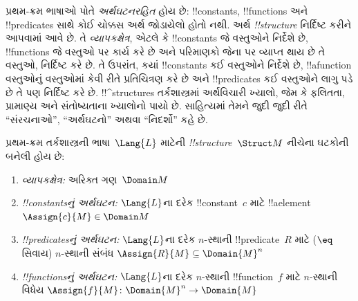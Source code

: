 \documentclass[../../../include/open-logic-section]{subfiles}
\begin{document}


\begin{explain}
પ્રથમ-ક્રમ ભાષાઓ પોતે
\emph{અર્થઘટનરહિત} હોય છે: !!{constant}s, !!{function}s અને
!!{predicate}s સાથે કોઈ ચોક્કસ અર્થ જોડાયેલો હોતો નથી. અર્થ
 \emph{!!{structure}} નિર્દિષ્ટ કરીને આપવામાં આવે
છે. તે \emph{વ્યાપકક્ષેત્ર}, એટલે કે !!{constant}s જે વસ્તુઓને નિર્દેશે છે,
!!{function}s જે વસ્તુઓ પર કાર્ય કરે છે અને પરિમાણકો જેના પર વ્યાપ્ત
થાય છે તે વસ્તુઓ, નિર્દિષ્ટ કરે છે. તે ઉપરાંત, કયાં !!{constant}s કઈ
વસ્તુઓને નિર્દેશે છે, !!a{function} વસ્તુઓનું વસ્તુઓમાં કેવી રીતે
પ્રતિચિત્રણ કરે છે અને !!{predicate}s કઈ વસ્તુઓને લાગુ પડે છે તે પણ
નિર્દિષ્ટ કરે છે. !!^{structure}s તર્કશાસ્ત્રમાં અર્થવિચારી ખ્યાલો,
જેમ કે ફલિતતા, પ્રામાણ્ય અને સંતોષ્યતાના ખ્યાલોનો પાયો છે. સાહિત્યમાં
તેમને જુદી જુદી રીતે ``સંરચનાઓ'', ``અર્થઘટનો'' અથવા ``નિદર્શો'' કહે
છે.
\end{explain}

\begin{defn}[!!^{structure}s]
પ્રથમ-ક્રમ તર્કશાસ્ત્રની ભાષા~$\Lang{L}$ માટેની 
\emph{!!{structure}}~$\Struct M$ નીચેના ઘટકોની બનેલી હોય છે:
\begin{enumerate}
\item \emph{વ્યાપકક્ષેત્ર:} અરિક્ત ગણ~$\Domain M$
\item \emph{!!{constant}sનું અર્થઘટન:} $\Lang{L}$ના દરેક
  !!{constant}~$c$ માટે !!a{element}~$\Assign{c}{M} \in \Domain M$
\item \emph{!!{predicate}sનું અર્થઘટન:} $\Lang{L}$ના દરેક $n$-સ્થાની
  !!{predicate}~$R$ માટે ($\eq$ સિવાય) $n$-સ્થાની સંબંધ
  $\Assign{R}{M} \subseteq \Domain{M}^n$
\item \emph{!!{function}sનું અર્થઘટન:} $\Lang{L}$ના દરેક $n$-સ્થાની
  !!{function}~$f$ માટે $n$-સ્થાની વિધેય
  $\Assign{f}{M} \colon \Domain{M}^n \to \Domain{M}$
\end{enumerate}
\end{defn}
\end{document}
